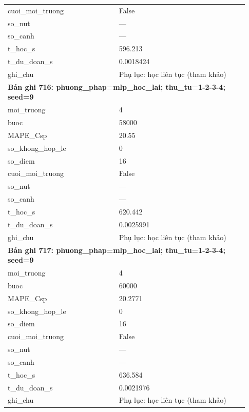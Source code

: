 \begin{longtable}{p{0.43\linewidth}p{0.50\linewidth}}
cuoi\_\allowbreak moi\_\allowbreak truong & False \\
so\_\allowbreak nut & — \\
so\_\allowbreak canh & — \\
t\_\allowbreak hoc\_\allowbreak s & 596.213 \\
t\_\allowbreak du\_\allowbreak doan\_\allowbreak s & 0.0018424 \\
ghi\_\allowbreak chu & Phụ lục: học liên tục (tham khảo) \\
\midrule
\multicolumn{2}{p{0.95\linewidth}}{\textbf{Bản ghi 716: phuong\_phap=mlp\_hoc\_lai; thu\_tu=1-2-3-4; seed=9}} \\
moi\_\allowbreak truong & 4 \\
buoc & 58000 \\
MAPE\_\allowbreak Csp & 20.55 \\
so\_\allowbreak khong\_\allowbreak hop\_\allowbreak le & 0 \\
so\_\allowbreak diem & 16 \\
cuoi\_\allowbreak moi\_\allowbreak truong & False \\
so\_\allowbreak nut & — \\
so\_\allowbreak canh & — \\
t\_\allowbreak hoc\_\allowbreak s & 620.442 \\
t\_\allowbreak du\_\allowbreak doan\_\allowbreak s & 0.0025991 \\
ghi\_\allowbreak chu & Phụ lục: học liên tục (tham khảo) \\
\midrule
\multicolumn{2}{p{0.95\linewidth}}{\textbf{Bản ghi 717: phuong\_phap=mlp\_hoc\_lai; thu\_tu=1-2-3-4; seed=9}} \\
moi\_\allowbreak truong & 4 \\
buoc & 60000 \\
MAPE\_\allowbreak Csp & 20.2771 \\
so\_\allowbreak khong\_\allowbreak hop\_\allowbreak le & 0 \\
so\_\allowbreak diem & 16 \\
cuoi\_\allowbreak moi\_\allowbreak truong & False \\
so\_\allowbreak nut & — \\
so\_\allowbreak canh & — \\
t\_\allowbreak hoc\_\allowbreak s & 636.584 \\
t\_\allowbreak du\_\allowbreak doan\_\allowbreak s & 0.0021976 \\
ghi\_\allowbreak chu & Phụ lục: học liên tục (tham khảo) \\

\end{longtable}

